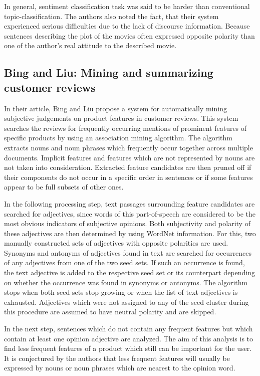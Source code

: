 \documentclass[a4paper,11pt]{article}
\begin{document}
In general, sentiment classification task was said to be harder than
conventional topic-classification.  The authors also noted the fact, that
their system experienced serious difficulties due to the lack of discourse
information.  Because sentences describing the plot of the movies often
expressed opposite polarity than one of the author's real attitude to the
described movie.

\subsection{Bing and Liu: Mining and summarizing customer reviews\cite{Bing-Liu-04}}
In their article, Bing and Liu \cite{Bing-Liu-04} propose a system for
automatically mining subjective judgements on product features in
customer reviews.  This system searches the reviews for frequently
occurring mentions of prominent features of specific products by using
an association mining algorithm.  The algorithm extracts nouns and
noun phrases which frequently occur together across multiple
documents.  Implicit features and features which are not represented
by nouns are not taken into consideration.  Extracted feature
candidates are then pruned off if their components do not occur in a
specific order in sentences or if some features appear to be full
subsets of other ones.

In the following processing step, text passages surrounding feature
candidates are searched for adjectives, since words of this
part-of-speech are considered to be the most obvious indicators of
subjective opinions.  Both subjectivity and polarity of these
adjectives are then determined by using WordNet information.  For
this, two manually constructed sets of adjectives with opposite
polarities are used.  Synonyms and antonyms of adjectives found in
text are searched for occurrences of any adjectives from one of the
two seed sets.  If such an occurrence is found, the text adjective is
added to the respective seed set or its counterpart depending on
whether the occurrence was found in synonyms or antonyms.  The
algorithm stops when both seed sets stop growing or when the list of
text adjectives is exhausted.  Adjectives which were not assigned to
any of the seed cluster during this procedure are assumed to have
neutral polarity and are skipped.

In the next step, sentences which do not contain any frequent features but
which contain at least one opinion adjective are analyzed.  The aim of this
analysis is to find less frequent features of a product which still can be
important for the user.  It is conjectured by the authors that less frequent
features will usually be expressed by nouns or noun phrases which are nearest
to the opinion word.
\end{document}
